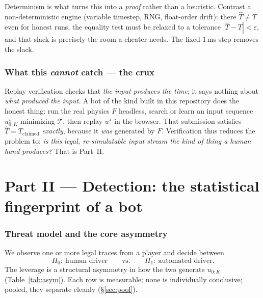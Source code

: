 \documentclass[11pt]{article}
\begin{document}
Determinism is what turns this into a \emph{proof} rather than a heuristic.
Contrast a non-deterministic engine (variable timestep, RNG, float-order drift):
there $\hat T \neq T$ even for honest runs, the equality test must be relaxed to a
tolerance $|\hat T - T| < \varepsilon$, and that slack is precisely the room a
cheater needs. The fixed $1$\,ms step removes the slack.

\section{What this \emph{cannot} catch --- the crux}

Replay verification checks that \emph{the input produces the time}; it says
nothing about \emph{what produced the input}. A bot of the kind built in this
repository does the honest thing: run the real physics $F$ headless, search or
learn an input sequence $u^\star_{0:K}$ minimizing $\mathcal{T}$, then replay
$u^\star$ in the browser. That submission satisfies $\hat T = T_{\text{claimed}}$
\emph{exactly}, because it \emph{was} generated by $F$. Verification thus reduces
the problem to: \emph{is this legal, re-simulatable input stream the kind of
thing a human hand produces?} That is Part~II.

\part*{Part II --- Detection: the statistical fingerprint of a bot}

\section{Threat model and the core asymmetry}

We observe one or more legal traces from a player and decide between
\begin{equation}
H_0:\ \text{human driver} \qquad\text{vs.}\qquad H_1:\ \text{automated driver}.
\end{equation}
The leverage is a structural asymmetry in how the two generate $u_{0:K}$
(Table~\ref{tab:asym}). Each row is measurable; none is individually conclusive;
pooled, they separate cleanly (\S\ref{sec:pool}).
\end{document}
